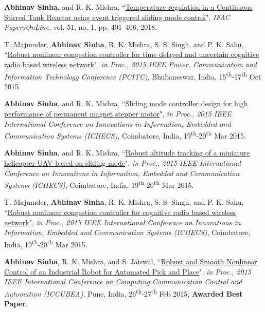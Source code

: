 {\begin{etaremune}[leftmargin=1cm]
		\item \textbf{Abhinav Sinha}, and R. K. Mishra, ``\href{https://www.sciencedirect.com/science/article/pii/S2405896318302210}{Temperature regulation in a Continuous Stirred Tank Reactor using event triggered sliding mode control}", \emph{IFAC PapersOnLine}, vol. 51, no. 1, pp. 401--406, 2018.
		\item T. Majumder, \textbf{Abhinav Sinha}, R. K. Mishra, S. S. Singh, and P. K. Sahu, ``\href{http://ieeexplore.ieee.org/abstract/document/7438169/}{Robust nonlinear congestion controller for time delayed and uncertain cognitive radio based wireless network}", \emph{in Proc., 2015 IEEE Power, Communication and Information Technology Conference (PCITC)}, Bhubaneswar, India, 15\textsuperscript{th}-17\textsuperscript{th} Oct 2015.
		\item \textbf{Abhinav Sinha}, and R. K. Mishra, ``\href{http://ieeexplore.ieee.org/abstract/document/7192930/}{Sliding mode controller design for high performance of permanent magnet stepper motor}", \emph{in Proc., 2015 IEEE International Conference on Innovations in Information, Embedded and Communication Systems (ICIIECS)}, Coimbatore, India, 19\textsuperscript{th}-20\textsuperscript{th} Mar 2015.
		\item \textbf{Abhinav Sinha}, and R. K. Mishra, ``\href{http://ieeexplore.ieee.org/abstract/document/7192889/}{Robust altitude tracking of a miniature helicopter UAV based on sliding mode}", \emph{in Proc., 2015 IEEE International Conference on Innovations in Information, Embedded and Communication Systems (ICIIECS)}, Coimbatore, India, 19\textsuperscript{th}-20\textsuperscript{th} Mar 2015.
		\item T. Majumder, \textbf{Abhinav Sinha}, R. K. Mishra, S. S. Singh, and P. K. Sahu, ``\href{http://ieeexplore.ieee.org/abstract/document/7192909/}{Robust nonlinear congestion controller for cognitive radio based wireless network}", \emph{in Proc., 2015 IEEE International Conference on Innovations in Information, Embedded and Communication Systems (ICIIECS)}, Coimbatore, India, 19\textsuperscript{th}-20\textsuperscript{th} Mar 2015.
		\item \textbf{Abhinav Sinha}, R. K. Mishra, and S. Jaiswal, ``\href{http://ieeexplore.ieee.org/abstract/document/7155798/}{Robust and Smooth Nonlinear Control of an Industrial Robot for Automated Pick and Place}", \emph{in Proc., 2015 IEEE International Conference on Computing Communication Control and Automation (ICCUBEA)}, Pune, India, 26\textsuperscript{th}-27\textsuperscript{th} Feb 2015, \textbf{Awarded Best Paper}.

\end{etaremune}}

